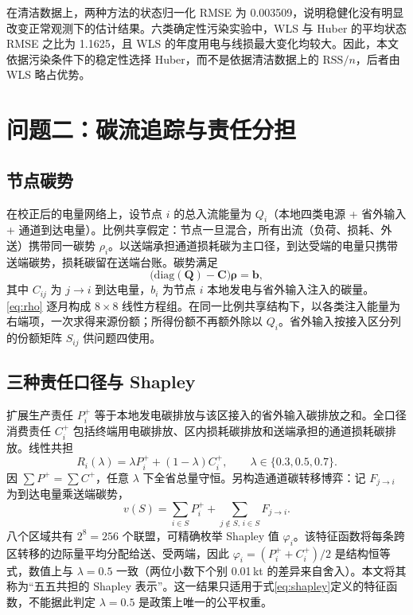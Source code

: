 \documentclass[UTF8,a4paper,zihao=-4,fontset=fandol]{ctexart}
\begin{document}
在清洁数据上，两种方法的状态归一化 RMSE 为 0.003509，说明稳健化没有明显改变正常观测下的估计结果。六类确定性污染实验中，WLS 与 Huber 的平均状态 RMSE 之比为 1.1625，且 WLS 的年度用电与线损最大变化均较大。因此，本文依据污染条件下的稳定性选择 Huber，而不是依据清洁数据上的 $\mathrm{RSS}/n$，后者由 WLS 略占优势。

\section{问题二：碳流追踪与责任分担}

\subsection{节点碳势}

在校正后的电量网络上，设节点 $i$ 的总入流能量为 $Q_i$（本地四类电源 + 省外输入 + 通道到达电量）。比例共享假定：节点一旦混合，所有出流（负荷、损耗、外送）携带同一碳势 $\rho_i$\cite{Bialek1996tracing,Kang2015carbon}。以送端承担通道损耗碳为主口径，到达受端的电量只携带送端碳势，损耗碳留在送端台账。碳势满足
\begin{equation}
\bigl(\mathrm{diag}(\boldsymbol Q)-\boldsymbol C\bigr)\boldsymbol\rho=\boldsymbol b,
\label{eq:rho}
\end{equation}
其中 $C_{ij}$ 为 $j\to i$ 到达电量，$b_i$ 为节点 $i$ 本地发电与省外输入注入的碳量。\eqref{eq:rho} 逐月构成 $8\times 8$ 线性方程组。在同一比例共享结构下，以各类注入能量为右端项，一次求得来源份额；所得份额不再额外除以 $Q_i$。省外输入按接入区分列的份额矩阵 $S_{ij}$ 供问题四使用。

\subsection{三种责任口径与 Shapley}

扩展生产责任 $P^+_i$ 等于本地发电碳排放与该区接入的省外输入碳排放之和\cite{Peters2008production}。全口径消费责任 $C^+_i$ 包括终端用电碳排放、区内损耗碳排放和送端承担的通道损耗碳排放\cite{Davis2010consumption}。线性共担\cite{Gallego2005consistent,Lenzen2007shared}
\begin{equation}
R_i(\lambda)=\lambda P^+_i+(1-\lambda)C^+_i,\qquad \lambda\in\{0.3,0.5,0.7\}.
\label{eq:lambda}
\end{equation}
因 $\sum P^+=\sum C^+$，任意 $\lambda$ 下全省总量守恒。另构造通道碳转移博弈：记 $F_{j\to i}$ 为到达电量乘送端碳势，
\begin{equation}
v(S)=\sum_{i\in S}P^+_i+\sum_{j\notin S,\,i\in S}F_{j\to i}.
\label{eq:shapley}
\end{equation}
八个区域共有 $2^8=256$ 个联盟，可精确枚举 Shapley 值 $\varphi_i$\cite{Qin2020cooperative}。该特征函数将每条跨区转移的边际量平均分配给送、受两端，因此 $\varphi_i=(P_i^++C_i^+)/2$ 是结构恒等式，数值上与 $\lambda=0.5$ 一致（两位小数下个别 0.01\,kt 的差异来自舍入）。本文将其称为“五五共担的 Shapley 表示”。这一结果只适用于式\eqref{eq:shapley}定义的特征函数，不能据此判定 $\lambda=0.5$ 是政策上唯一的公平权重。
\end{document}
